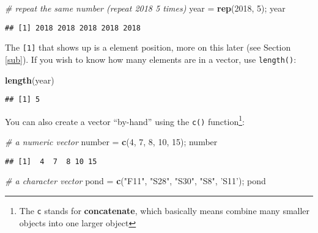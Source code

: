 \documentclass[]{book}
\newenvironment{Shaded}{\begin{snugshade}}{\end{snugshade}}
\newcommand{\KeywordTok}[1]{\textcolor[rgb]{0.13,0.29,0.53}{\textbf{#1}}}
\newcommand{\DecValTok}[1]{\textcolor[rgb]{0.00,0.00,0.81}{#1}}
\newcommand{\StringTok}[1]{\textcolor[rgb]{0.31,0.60,0.02}{#1}}
\newcommand{\CommentTok}[1]{\textcolor[rgb]{0.56,0.35,0.01}{\textit{#1}}}
\newcommand{\NormalTok}[1]{#1}
\let\rmarkdownfootnote\footnote%
\def\footnote{\protect\rmarkdownfootnote}
\theoremstyle{definition}
\theoremstyle{definition}
\theoremstyle{definition}
\theoremstyle{remark}
\begin{document}
\begin{Shaded}
\begin{Highlighting}[]
\CommentTok{# repeat the same number (repeat 2018 5 times)}
\NormalTok{year =}\StringTok{ }\KeywordTok{rep}\NormalTok{(}\DecValTok{2018}\NormalTok{, }\DecValTok{5}\NormalTok{); year}
\end{Highlighting}
\end{Shaded}

\begin{verbatim}
## [1] 2018 2018 2018 2018 2018
\end{verbatim}

The \texttt{{[}1{]}} that shows up is a element position, more on this
later (see Section \ref{sub}). If you wish to know how many elements are
in a vector, use \texttt{length()}:

\begin{Shaded}
\begin{Highlighting}[]
\KeywordTok{length}\NormalTok{(year)}
\end{Highlighting}
\end{Shaded}

\begin{verbatim}
## [1] 5
\end{verbatim}

You can also create a vector ``by-hand'' using the \texttt{c()}
function\footnote{The \texttt{c} stands for \textbf{concatenate}, which
  basically means combine many smaller objects into one larger object}:

\begin{Shaded}
\begin{Highlighting}[]
\CommentTok{# a numeric vector}
\NormalTok{number =}\StringTok{ }\KeywordTok{c}\NormalTok{(}\DecValTok{4}\NormalTok{, }\DecValTok{7}\NormalTok{, }\DecValTok{8}\NormalTok{, }\DecValTok{10}\NormalTok{, }\DecValTok{15}\NormalTok{); number}
\end{Highlighting}
\end{Shaded}

\begin{verbatim}
## [1]  4  7  8 10 15
\end{verbatim}

\begin{Shaded}
\begin{Highlighting}[]
\CommentTok{# a character vector}
\NormalTok{pond =}\StringTok{ }\KeywordTok{c}\NormalTok{(}\StringTok{"F11"}\NormalTok{, }\StringTok{"S28"}\NormalTok{, }\StringTok{"S30"}\NormalTok{, }\StringTok{"S8"}\NormalTok{, }\StringTok{'S11'}\NormalTok{); pond}
\end{Highlighting}
\end{Shaded}
\end{document}
